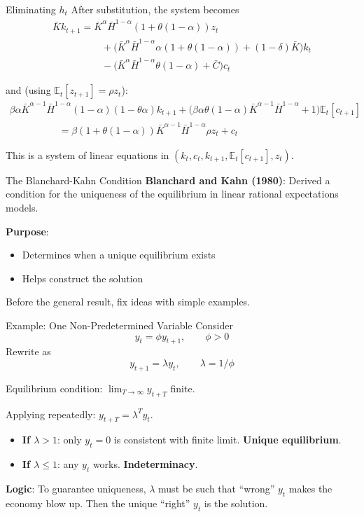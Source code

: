 \documentclass[blue]{beamer}
\newcommand{\E}{\mathbb{E}}
\begin{document}
\begin{frame}{Eliminating $h_t$}
	\small
	After substitution, the system becomes
	\[
	\begin{array}{l}
	\bar{K} k_{t+1} = \bar{K}^\alpha \bar{H}^{1-\alpha}(1 + \theta(1-\alpha)) z_t \\
	\quad\quad\quad\quad\quad + \bigl(\bar{K}^\alpha \bar{H}^{1-\alpha} \alpha(1+\theta(1-\alpha)) + (1-\delta) \bar{K}\bigr) k_t\\
	 \quad\quad\quad\quad\quad- \bigl(\bar{K}^\alpha \bar{H}^{1-\alpha} \theta(1-\alpha) + \bar{C}\bigr) c_t
	\end{array}
	\]
	
	\medskip
	and (using $\E_t[z_{t+1}] = \rho z_t$):
	\[
	\begin{array}{l}
	\beta \alpha \bar{K}^{\alpha-1} \bar{H}^{1-\alpha}(1-\alpha)(1-\theta\alpha) k_{t+1} + \bigl(\beta \alpha \theta(1-\alpha) \bar{K}^{\alpha-1} \bar{H}^{1-\alpha} + 1\bigr) \E_t[c_{t+1}]\\
	\quad\quad\quad\quad\quad= \beta(1 + \theta(1-\alpha)) \bar{K}^{\alpha-1} \bar{H}^{1-\alpha} \rho z_t + c_t
	\end{array}
	\]
	
	\medskip
	\normalsize
	This is a system of linear equations in $(k_t, c_t, k_{t+1}, \E_t[c_{t+1}], z_t)$.
\end{frame}

\begin{frame}{The Blanchard-Kahn Condition}
	\textbf{Blanchard and Kahn (1980)}: Derived a condition for the uniqueness of the equilibrium in linear rational expectations models.
	
	\bigskip
	\textbf{Purpose}:
	\begin{itemize}
		\item Determines when a unique equilibrium exists
		\item Helps construct the solution
	\end{itemize}
	
	\bigskip
	Before the general result, fix ideas with simple examples.
\end{frame}



\begin{frame}{Example: One Non-Predetermined Variable}
	Consider
	\[
	y_t = \phi y_{t+1}, \qquad \phi > 0
	\]
	Rewrite as
	\[
	y_{t+1} = \lambda y_t, \qquad \lambda = 1/\phi
	\]
	
	Equilibrium condition: $\lim_{T \to \infty} y_{t+T}$ finite.
	
	
	Applying repeatedly: $y_{t+T} = \lambda^T y_t$.
	
	
	\begin{itemize}
		\item \textbf{If $\lambda > 1$}: only $y_t = 0$ is consistent with finite limit. \textbf{Unique equilibrium}.
		\item \textbf{If $\lambda \leq 1$}: any $y_t$ works. \textbf{Indeterminacy}.
	\end{itemize}
	
	
	\textbf{Logic}: To guarantee uniqueness, $\lambda$ must be such that ``wrong'' $y_t$ makes the economy blow up. Then the unique ``right'' $y_t$ is the solution.
\end{frame}
\end{document}
